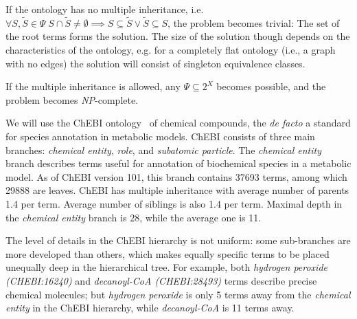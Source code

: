 \documentclass[10pt]{bmc_article}
\newenvironment{bmcformat}{\baselineskip20pt\sloppy\setboolean{publ}{false}}{\baselineskip20pt\sloppy}
\begin{document}
\begin{bmcformat}
If the ontology has no multiple inheritance, i.e. $\forall S, \tilde{S} \in \Psi \; S \cap \tilde{S} \neq \emptyset \implies S \subseteq \tilde{S} \lor \tilde{S} \subseteq S$, the problem becomes trivial: The set of the root terms forms the solution. The size of the solution though depends on the characteristics of the ontology, e.g. for a completely flat ontology (i.e., a graph with no edges) the solution will consist of singleton equivalence classes.

If the multiple inheritance is allowed, any $\Psi \subseteq 2^X$ becomes possible, and the problem becomes \textit{NP}-complete. 

We will use the ChEBI ontology~\cite{deMatos10} of chemical compounds, the \textit{de facto} a standard for species annotation in metabolic models. ChEBI consists of three main branches: \textit{chemical entity}, \textit{role}, and \textit{subatomic particle}. The \textit{chemical entity} branch describes terms useful for annotation of biochemical species in a metabolic model. As of ChEBI version 101, this branch contains 37693 terms, among which 29888 are leaves. ChEBI has multiple inheritance with average number of parents 1.4 per term. Average number of siblings is also 1.4 per term. Maximal depth in the \textit{chemical entity} branch is 28, while the average one is 11.

The level of details in the ChEBI hierarchy is not uniform: some sub-branches are more developed than others, which makes equally specific terms to be placed unequally deep in the hierarchical tree. For example, both \textit{hydrogen peroxide (CHEBI:16240)} and \textit{decanoyl-CoA (CHEBI:28493)} terms describe precise chemical molecules; but \textit{hydrogen peroxide} is only 5 terms away from the \textit{chemical entity} in the ChEBI hierarchy, while \textit{decanoyl-CoA} is 11 terms away. 


\end{bmcformat}
\end{document}
